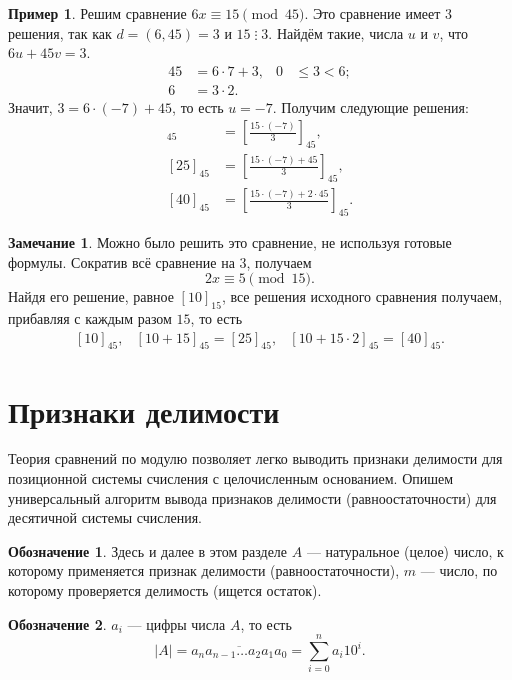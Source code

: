 \documentclass[14pt, a4paper]{extarticle}
\theoremstyle{definition}
\newtheorem*{remark}{Замечание}
\newtheorem*{desig}{Обозначение}
\newtheorem{example}{Пример}
\newcommand{\divisible}{\mathop{\vdots}}
\begin{document}
	\begin{example}
		Решим сравнение $6x\equiv15\pmod{45}$. Это сравнение имеет $3$ решения, так как $d=(6,45)=3$ и $15\divisible3$. Найдём такие, числа $u$ и $v$, что $6u+45v=3$.
		\begin{align*}
			45&=6\cdot7+3,&0&\leqslant3<6;\\
			6&=3\cdot2.
		\end{align*}
		Значит, $3=6\cdot(-7)+45$, то есть $u=-7$. Получим следующие решения:
		\begin{align*}
			[10]_{45}&=\left[\frac{15\cdot(-7)}{3}\right]_{45},\\
			[25]_{45}&=\left[\frac{15\cdot(-7)+45}{3}\right]_{45},\\
			[40]_{45}&=\left[\frac{15\cdot(-7)+2\cdot45}{3}\right]_{45}.
		\end{align*}
	\end{example}
	
	\begin{remark}
		Можно было решить это сравнение, не используя готовые формулы. Сократив всё сравнение на $3$, получаем
		$$2x\equiv5\pmod{15}.$$
		Найдя его решение, равное $[10]_{15}$, все решения исходного сравнения получаем, прибавляя с каждым разом $15$, то есть
		$$\begin{array}{ccc}
			[10]_{45},&[10+15]_{45}=[25]_{45},&[10+15\cdot2]_{45}=[40]_{45}.
		\end{array}$$
	\end{remark}

\newpage
\section{Признаки делимости}

	Теория сравнений по модулю позволяет легко выводить признаки делимости для позиционной системы счисления с целочисленным основанием. Опишем универсальный алгоритм вывода признаков делимости (равноостаточности) для десятичной системы счисления.

	\begin{desig}
		Здесь и далее в этом разделе $A$ --- натуральное (целое) число, к которому применяется признак делимости (равноостаточности), $m$ --- число, по которому проверяется делимость (ищется остаток).
	\end{desig}

	\begin{desig}
		$a_i$ --- цифры числа $A$, то есть
		$$|A|=\overline{a_na_{n-1}\dots a_2a_1a_0}=\sum_{i=0}^na_i10^i.$$
	\end{desig}
\end{document}
